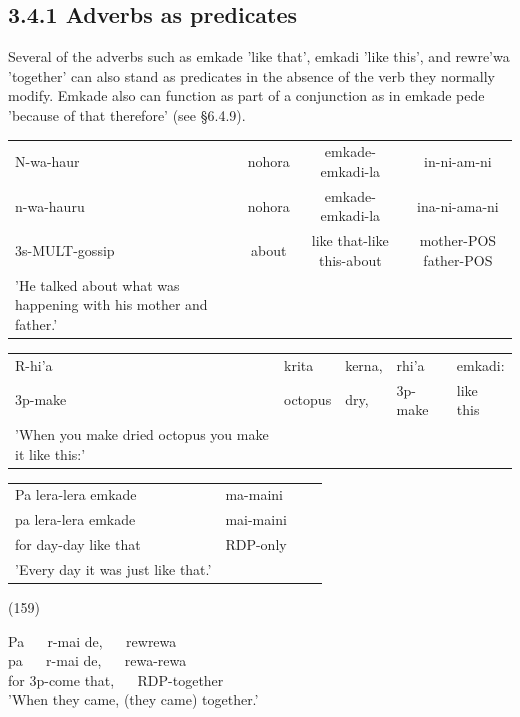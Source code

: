 \documentclass[10pt]{article}
\begin{document}
\subsection*{3.4.1 Adverbs as predicates}
Several of the adverbs such as emkade 'like that', emkadi 'like this', and rewre'wa 'together' can also stand as predicates in the absence of the verb they normally modify. Emkade also can function as part of a conjunction as in emkade pede 'because of that therefore' (see §6.4.9).

\begin{center}
\begin{tabular}{lccc}
N-wa-haur & nohora & emkade-emkadi-la & in-ni-am-ni \\
n-wa-hauru & nohora & emkade-emkadi-la & ina-ni-ama-ni \\
3s-MULT-gossip & about & like that-like this-about & mother-POS father-POS \\
'He talked about what was happening with his mother and father.' &  &  &  \\
\end{tabular}
\end{center}

\begin{center}
\begin{tabular}{lllll}
R-hi'a & krita & kerna, & rhi'a & emkadi: \\
3p-make & octopus & dry, & 3p-make & like this \\
'When you make dried octopus you make it like this:' &  &  &  &  \\
\end{tabular}
\end{center}

\begin{center}
\begin{tabular}{llll}
Pa lera-lera emkade & ma-maini \\
pa lera-lera emkade & mai-maini \\
for day-day like that & RDP-only \\
'Every day it was just like that.' &  \\
\end{tabular}
\end{center}

(159)

Pa \(\quad\) r-mai de, \(\quad\) rewrewa\\
pa \(\quad\) r-mai de, \(\quad\) rewa-rewa\\
for 3p-come that, \(\quad\) RDP-together\\
'When they came, (they came) together.'
\end{document}
